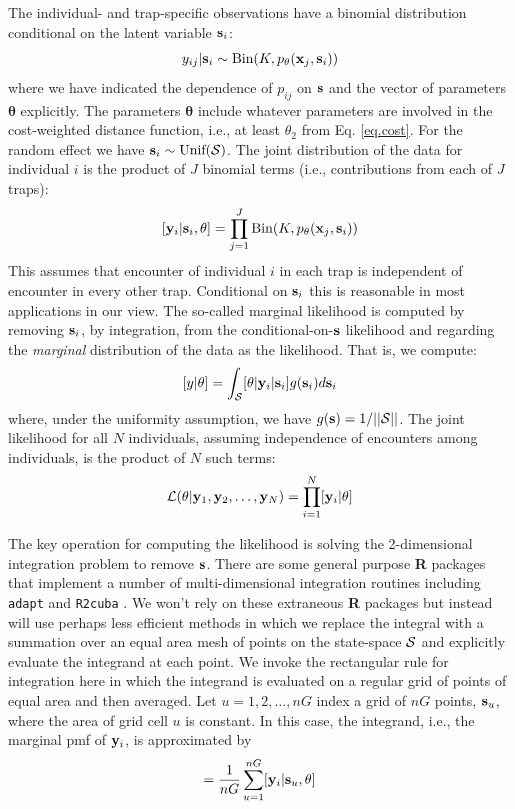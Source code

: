 The individual- and trap-specific observations have a binomial
distribution conditional on the latent variable ${\bf s}_{i}$:
\begin{equation}
	y_{ij}| {\bf s}_{i} \sim \mbox{Bin}(K, p_{\theta}({\bf x}_{j},{\bf s}_{i}))
\label{mle.eq.cond-on-s}
\end{equation}
where we have indicated the dependence of $p_{ij}$ on ${\bf s}$ and
the vector of parameters ${\bm \theta}$ explicitly. The parameters
${\bm \theta}$ include whatever parameters are involved in the
cost-weighted distance function, i.e., at least $\theta_{2}$ from 
Eq. \ref{eq.cost}.
For the random effect we have ${\bf s}_{i} \sim  \mbox{Unif}({\cal
  S})$.
The joint distribution of the data for individual $i$ is the product
of $J$ binomial terms (i.e., contributions from each of $J$ traps):
\[
  [{\bf y}_{i} | {\bf s}_{i} , \theta] = 
  \prod_{j=1}^{J} \mbox{Bin}(K, p_{\theta}({\bf x}_{j},{\bf s}_{i}) )
\]
This assumes that encounter of individual $i$ in each
trap is independent of encounter in every other trap. Conditional on
${\bf s}_{i}$ this is reasonable in most applications in our view.
 The so-called marginal likelihood is computed by removing
${\bf s}_{i}$, by integration,  from the conditional-on-${\bf s}$
likelihood and regarding the {\it marginal} distribution of the data
as the likelihood. That
is, we compute:
\[
  [y|\theta] = 
\int_{{\cal S}}  [ \theta | {\bf y}_{i} |{\bf s}_{i}] g({\bf s}_{i}) d{\bf s}_{i}
\]
where, under the uniformity assumption, we have
$g({\bf s}) = 1/||{\cal S}||$.
The joint likelihood for all $N$ individuals, assuming independence of
encounters among individuals, is the product of $N$ such terms:
\[
{\cal L}(\theta | {\bf y}_{1},{\bf y}_{2},\ldots, {\bf y}_{N}) = \prod_{i=1}^{N}
[{\bf y}_{i}|\theta]
\]

The key operation for computing the likelihood is solving the
2-dimensional integration problem to remove ${\bf s}$. There are some
general purpose {\bf R} packages that implement a number of
multi-dimensional integration routines including \mbox{\tt adapt}
\citep{genz_etal:2007} and \mbox{\tt R2cuba} \citep{hahn_etal:2011}.
We won't rely on these extraneous {\bf R} packages but instead will
use perhaps less efficient methods in which we replace the integral
with a summation over an equal area mesh of points on the state-space
${\cal S}$ and explicitly evaluate the integrand at each point. We
invoke the rectangular rule for integration here in which the
integrand is evaluated on a regular grid of points of equal area and
then averaged.  Let $u=1,2,\ldots,nG$ index a grid of $nG$ points,
${\bf s}_{u}$, where the area of grid cell $u$ is constant.  In this
case, the integrand, i.e., the marginal pmf of ${\bf y}_{i}$, is
approximated by
\begin{equation}
         [{\bf y}_{i}|\theta] = \frac{1}{nG} \sum_{u=1}^{nG}  [ {\bf
            y}_{i} |{\bf s}_u, \theta]
\label{mle.eq.intlik}
\end{equation}

